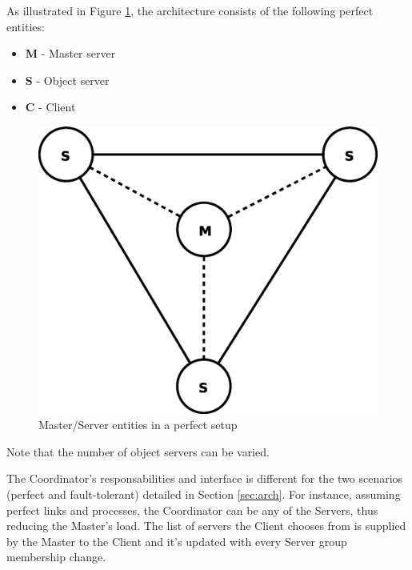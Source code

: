 \documentclass[times, 10pt,twocolumn]{article}
\begin{document}
\label{subsec:perf}
As illustrated in Figure \ref{fig:perf}, the architecture consists of the 
following perfect entities: 
\begin{itemize}[noitemsep,nolistsep]
\item {\bf M} - Master server 
\item {\bf S} - Object server
\item {\bf C} - Client      
\end{itemize}

\begin{figure}
\centering
\includegraphics[scale=0.3]{perfect.eps}
\caption{Master/Server entities in a perfect setup}
\label{fig:perf}
\end{figure}
Note that the number of object servers can be varied.
\label{subsec:recov}

\label{subsec:respon}

The Coordinator's responsabilities and interface is different for the two scenarios (perfect and fault-tolerant) detailed in Section \ref{sec:arch}. For instance, assuming perfect links and processes, the Coordinator can be any of the Servers, thus reducing the Master's load. The list of servers the Client chooses from is supplied by the Master to the Client and it's updated with every Server group membership change.
\end{document}
